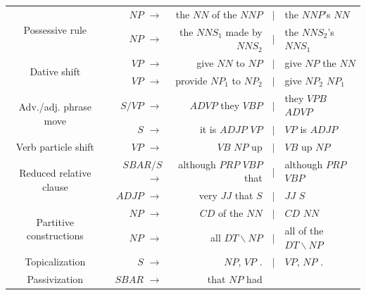\documentclass[11pt]{article}
\begin{document}
\begin{table}[!ht]
  \begin{center}
\small
  \begin{tabular}{|c|rrcl|}
    \hline
    \multirow{2}{*}{Possessive rule} & $\mathit{NP}$ $\rightarrow$ & the
    $\mathit{NN}$ of the $\mathit{NNP}$ & $\mid$ & the
    $\mathit{NNP}$'s $\mathit{NN}$ \\
    & $\mathit{NP}$ $\rightarrow$  & the $\mathit{NNS}_1$ made by
    $\mathit{NNS}_2$ & $\mid$ & the $\mathit{NNS}_2$'s
    $\mathit{NNS}_1$ \\
    \hline
    \multirow{2}{*}{Dative shift} & $\mathit{VP}$ $\rightarrow$ & give
    $\mathit{NN}$ to $\mathit{NP}$ & $\mid$ & give $\mathit{NP}$ the
    $\mathit{NN}$ \\
    & $\mathit{VP}$ $\rightarrow$ & provide $\mathit{NP}_1$ to
    $\mathit{NP}_2$ & $\mid$ & give $\mathit{NP}_2$
    $\mathit{NP}_1$ \\
    \hline
    \hline
    \multirow{2}{*}{Adv./adj. phrase move} & 
    $\mathit{S/VP}$ $\rightarrow$ & $\mathit{ADVP}$ they $\mathit{VBP}$
    & $\mid$ & they $\mathit{VPB}$ $\mathit{ADVP}$ \\
    & $\mathit{S}$ $\rightarrow$ & it is $\mathit{ADJP}$ $\mathit{VP}$
    & $\mid$ & $\mathit{VP}$ is $\mathit{ADJP}$ \\
    \hline
    Verb particle shift & 
    $\mathit{VP}$ $\rightarrow$ & $\mathit{VB}$ $\mathit{NP}$ up &
    $\mid$ & $\mathit{VB}$ up $\mathit{NP}$ \\
    \hline
    \multirow{2}{*}{Reduced relative clause} & $\mathit{SBAR/S}$ $\rightarrow$ &
    although $\mathit{PRP}$ $\mathit{VBP}$ that & $\mid$ &although
    $\mathit{PRP}$ $\mathit{VBP}$ \\
    & $\mathit{ADJP}$ $\rightarrow$ &
    very $\mathit{JJ}$ that $\mathit{S}$ & $\mid$ & $\mathit{JJ}$ $\mathit{S}$ \\
    \hline
    \multirow{2}{*}{Partitive constructions} & 
    $\mathit{NP}$ $\rightarrow$ & $\mathit{CD}$ of the $\mathit{NN}$
    & $\mid$ & $\mathit{CD}$ $\mathit{NN}$ \\
    & $\mathit{NP}$ $\rightarrow$ & all $\mathit{DT\backslash NP}$
    & $\mid$ & all of the $\mathit{DT\backslash NP}$ \\
    \hline
    Topicalization  & $\mathit{S}$ $\rightarrow$ & $\mathit{NP}$,
    $\mathit{VP}$ . & $\mid$ & $\mathit{VP}$, $\mathit{NP}$ . \\
    \hline
    \hline
    Passivization &
    $\mathit{SBAR}$ $\rightarrow$ & that $\mathit{NP}$ had

\end{tabular}
\end{center}
\end{table}
\end{document}
